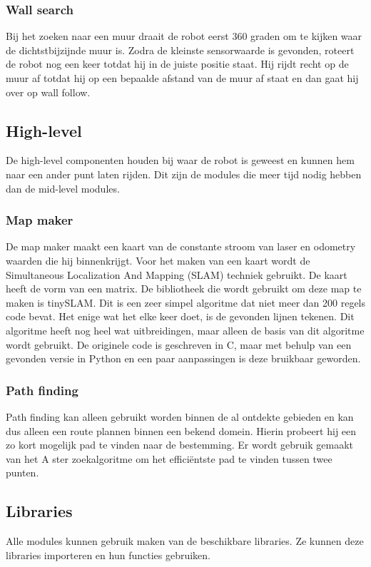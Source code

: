 \documentclass[a4paper,10pt]{article}
\begin{document}
\subsubsection{Wall search}
Bij het zoeken naar een muur draait de robot eerst 360 graden om te kijken waar de dichtstbijzijnde muur is. Zodra de kleinste sensorwaarde is gevonden, roteert de robot nog een keer totdat hij in de juiste positie staat. Hij rijdt recht op de muur af totdat hij op een bepaalde afstand van de muur af staat en dan gaat hij over op wall follow.

\subsection{High-level}
De high-level componenten houden bij waar de robot is geweest en kunnen hem naar een ander punt laten rijden. Dit zijn de modules die meer tijd nodig hebben dan de mid-level modules.

\subsubsection{Map maker}
De map maker maakt een kaart van de constante stroom van laser en odometry waarden die hij binnenkrijgt. Voor het maken van een kaart wordt de Simultaneous Localization And Mapping (SLAM) techniek gebruikt. De kaart heeft de vorm van een matrix.
De bibliotheek die wordt gebruikt om deze map te maken is tinySLAM. Dit is een zeer simpel algoritme dat niet meer dan 200 regels code bevat. Het enige wat het elke keer doet, is de gevonden lijnen tekenen. Dit algoritme heeft nog heel wat uitbreidingen, maar alleen de basis van dit algoritme wordt gebruikt. De originele code is geschreven in C, maar met behulp van een gevonden versie in Python en een paar aanpassingen is deze bruikbaar geworden.

\subsubsection{Path finding}
Path finding kan alleen gebruikt worden binnen de al ontdekte gebieden en kan dus alleen een route plannen binnen een bekend domein. Hierin probeert hij een zo kort mogelijk pad te vinden naar de bestemming. Er wordt gebruik gemaakt van het A ster zoekalgoritme om het effici\"{e}ntste pad te vinden tussen twee punten.
\subsection{Libraries}
Alle modules kunnen gebruik maken van de beschikbare libraries. Ze kunnen deze libraries importeren en hun functies gebruiken.
\end{document}
